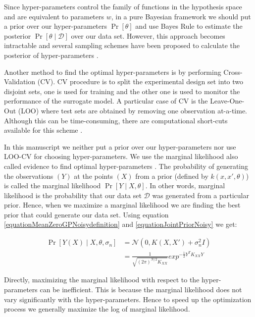 Since hyper-parameters control the family of functions in the hypothesis space and are equivalent to parameters \(w\), in a pure Bayesian framework we should put a prior over our hyper-parameters \(\Pr[\theta]\) and use Bayes Rule to estimate the posterior \(\Pr[\theta \mid \mathcal{D}]\) over our data set. However, this approach becomes intractable and several sampling schemes have been proposed to calculate the posterior of hyper-parameters \cite{osborne2010bayesian, neal2011mcmc}.

Another method to find the optimal hyper-parameters is by performing Cross-Validation (CV). CV procedure is to split the experimental design set into two disjoint sets, one is used for training and the other one is used to monitor the performance
of the surrogate model. A particular case of CV is the Leave-One-Out (LOO) where test sets are obtained by removing one observation at-a-time. Although this can be time-consuming, there are computational short-cuts available for this scheme \cite{rasmussen2006gaussian, dubrule1983cross, le2013multi}. 

In this manuscript we neither put a prior over our hyper-parameters nor use LOO-CV for choosing hyper-parameters. We use the marginal likelihood also called evidence to find optimal hyper-parameters \cite{mackay2003information}. The probability of generating the observations \((Y)\) at the points \((X)\) from a prior (defined by \(k(x, x', \theta)\)) is called the marginal likelihood \(\Pr[Y \mid X, \theta]\). In other words, marginal likelihood is the probability that our data set \(\mathcal{D}\) was generated from a particular prior. Hence, when we maximize a marginal likelihood we are finding the best prior that could generate our data set. Using equation \ref{equationMeanZeroGPNoisydefinition} and \ref{equationJointPriorNoisy} we get:

\begin{equation}\label{equationMarginalLikelihood}
\begin{aligned}
\Pr[Y(X) \mid X, \theta, \sigma_{n}] & = \mathcal{N}(0 , K(X, X') + \sigma^{2}_{n}I)  \\
& = \frac{1}{\sqrt{(2\pi)^{N/2} K_{XX}}} exp^{-\frac{1}{2}Y^{T}K_{XX}Y}
\end{aligned}
\end{equation}

 Directly, maximizing the marginal likelihood with respect to the hyper-parameters can be inefficient. This is because the marginal likelihood does not vary significantly with the hyper-parameters. Hence to speed up the optimization process we generally maximize the log of marginal likelihood. 

